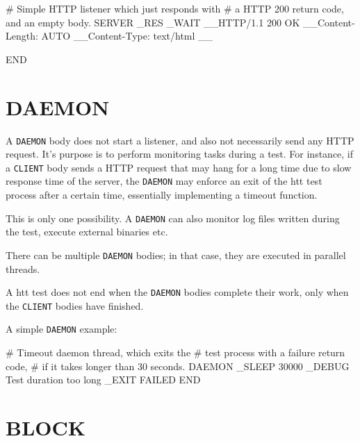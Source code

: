 \begin{usplisting}
    # Simple HTTP listener which just responds with
    # a HTTP 200 return code, and an empty body.
    SERVER
    _RES
    _WAIT
    __HTTP/1.1 200 OK
    __Content-Length: AUTO
    __Content-Type: text/html
    __

    END
\end{usplisting}



\newpage
\section{DAEMON}
\label{chap:daemon}

A \texttt{DAEMON} body does not start a listener, and also not necessarily 
send any HTTP request. It's purpose is to perform monitoring tasks during 
a test. For instance, if a \texttt{CLIENT} body sends a HTTP request that 
may hang for a long time due to slow response time of the server, the 
\texttt{DAEMON} may enforce an exit of the htt test process after a certain 
time, essentially implementing a timeout function.

This is only one possibility. A \texttt{DAEMON} can also monitor log files 
written during the test, execute external binaries etc.

There can be multiple \texttt{DAEMON} bodies; in that case, 
they are executed in parallel threads.

A htt test does not end when the \texttt{DAEMON} bodies complete their work, 
only when the \texttt{CLIENT} bodies have finished.

A simple \texttt{DAEMON} example:

\begin{usplisting}
    # Timeout daemon thread, which exits the 
    # test process with a failure return code,
    # if it takes longer than 30 seconds.
    DAEMON
    _SLEEP 30000
    _DEBUG Test duration too long
    _EXIT FAILED
    END
\end{usplisting}



\newpage
\section{BLOCK}
\label{chap:block}

